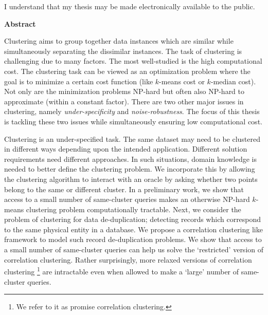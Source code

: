 \documentclass[letterpaper,12pt,titlepage,oneside,final]{book}
\let\origdoublepage\cleardoublepage
\newcommand{\clearemptydoublepage}{%
  \clearpage{\pagestyle{empty}\origdoublepage}}
\let\cleardoublepage\clearemptydoublepage
\begin{document}
  \bigskip
  
  \noindent
I understand that my thesis may be made electronically available to the public.

\cleardoublepage

\begin{center}\textbf{Abstract}\end{center}
Clustering aims to group together data instances which are similar while simultaneously separating the dissimilar instances. The task of clustering is challenging due to many factors. The most well-studied is the high computational cost. The clustering task can be viewed as an optimization problem where the goal is to minimize a certain cost function (like $k$-means cost or $k$-median cost). Not only are the minimization problems NP-hard but often also NP-hard to approximate (within a constant factor). There are two other major issues in clustering, namely \emph{under-specificity} and \emph{noise-robustness}. The focus of this thesis is tackling these two issues while simultaneously ensuring low computational cost. 

Clustering is an under-specified task. The same dataset may need to be clustered in different ways depending upon the intended application. Different solution requirements need different approaches. In such situations, domain knowledge is needed to better define the clustering problem. We incorporate this by allowing the clustering algorithm to interact with an oracle by asking whether two points belong to the same or different cluster. In a preliminary work, we show that access to a small number of same-cluster queries makes an otherwise NP-hard $k$-means clustering problem computationally tractable. Next, we consider the problem of clustering for data de-duplication; detecting records which correspond to the same physical entity in a database. We propose a correlation clustering like framework to model such record de-duplication problems. We show that access to a small number of same-cluster queries can help us solve the `restricted' version of correlation clustering. Rather surprisingly, more relaxed versions of correlation clustering \footnote{We refer to it as promise correlation clustering.} are intractable even when allowed to make a `large' number of same-cluster queries. 
\end{document}
